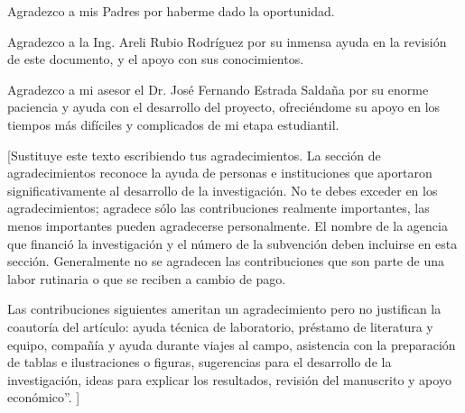 \begin{thanks}

Agradezco a mis Padres por haberme dado la oportunidad.

Agradezco a la Ing. Areli Rubio Rodríguez por su inmensa ayuda en la revisión de este documento, y el apoyo con sus conocimientos.

Agradezco a mi asesor el Dr. José Fernando Estrada Saldaña por su enorme paciencia y ayuda con el desarrollo del proyecto, ofreciéndome su apoyo en los tiempos más difíciles y complicados de mi etapa estudiantil.

[Sustituye este texto escribiendo tus agradecimientos.
La sección de agradecimientos reconoce la ayuda de personas e instituciones que aportaron significativamente al desarrollo de la investigación. No te debes exceder en los agradecimientos; agradece sólo las contribuciones realmente importantes, las menos importantes pueden agradecerse personalmente. El nombre de la agencia que financió la investigación y el número de la subvención deben incluirse en esta sección. Generalmente no se agradecen las contribuciones que son parte de una labor rutinaria o que se reciben a cambio de pago.

         Las contribuciones siguientes ameritan un agradecimiento pero no justifican la coautoría del artículo: ayuda técnica de laboratorio, préstamo de literatura y equipo, compañía y ayuda durante viajes al campo, asistencia con la preparación de tablas e ilustraciones o figuras, sugerencias para el desarrollo de la investigación, ideas para explicar los resultados, revisión del manuscrito y apoyo económico”.
]


\end{thanks}
